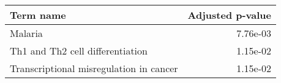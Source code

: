 \begin{tabular}{lr}
\toprule
                              Term name &  Adjusted p-value \\
\midrule
                                Malaria &          7.76e-03 \\
       Th1 and Th2 cell differentiation &          1.15e-02 \\
Transcriptional misregulation in cancer &          1.15e-02 \\
\bottomrule
\end{tabular}

